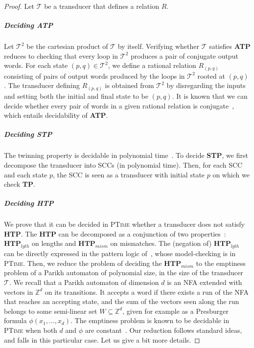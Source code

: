 \documentclass[a4paper,UKenglish,cleveref, autoref, thm-restate,authorcolumns, colorlinks]{lipics-v2021}
\newcommand\calT{\mathcal{T}}
\newcommand{\TP}[0]{\textbf{TP}}
\newcommand{\ATP}[0]{\textbf{ATP}}
\newcommand{\STP}[0]{\textbf{STP}}
\newcommand{\HTP}[0]{\textbf{HTP}}
\begin{document}
\begin{proof}
    Let $\calT$ be a transducer that defines a relation $R$.
    
    \subparagraph*{Deciding \ATP{}} Let $\calT^2$ be the cartesian product of $\calT$ by itself.
    Verifying whether $\calT$ satisfies \ATP{} reduces to checking
    that every loop in $\calT^2$ produces a pair of conjugate output words.
    For each state $(p,q) \in \calT^2$,
    we define a rational relation $R_{(p,q)}$
    consisting of pairs of output words produced by the loops in $\calT^2$ rooted at $(p,q)$.
    The transducer defining $R_{(p,q)}$ is obtained from $\calT^2$
    by disregarding the inputs and setting both the initial and final state to be $(p,q)$.
    It is known that we can decide whether every pair of words in a given rational relation is conjugate~\cite{decidingconjugacy}, which entails decidability of 
   \ATP.
   
    \subparagraph*{Deciding \STP{}} The twinning property is decidable in polynomial time~\cite{twinningproperty}. To decide \STP{}, we first decompose the transducer
    into SCCs (in polynomial time). Then, for each SCC and each state $p$,
    the SCC is seen as a transducer with initial state $p$ on which we check \TP{}.

    \subparagraph*{Deciding \HTP{}} We prove that it can be decided in \textsc{PTime} whether a transducer
    does not satisfy \HTP.
    The \HTP{} can be decomposed as a conjunction of two properties~:
    $\HTP_{lgth}$ on lengths and $\HTP_{mism}$ on mismatches.
    The (negation of) $\HTP_{lgth}$ can be directly expressed in the pattern logic of~\cite{DBLP:journals/ijfcs/FiliotMR20}, whose model-checking is in \textsc{PTime}. 
     Then, we reduce the problem of deciding the $\HTP_{mism}$ to the emptiness problem of a Parikh automaton of polynomial size, in the size of the transducer $\calT$. We recall that a Parikh automaton of dimension $d$ is an NFA extended with vectors in $\mathbb{Z}^d$ on its transitions. It accepts a word if there exists a run of the NFA that reaches an accepting state, and the sum of the vectors seen along the run belongs to some semi-linear set $W\subseteq \mathbb{Z}^d$, given for example as a Presburger formula $\phi(x_1,\dots,x_d)$. The emptiness problem is known to be decidable in \textsc{PTime} when both $d$ and $\phi$ are constant~\cite{DBLP:conf/lics/FigueiraL15,DBLP:journals/ijfcs/FiliotMR20}. Our reduction follows standard ideas, 
     and falls in this particular case. Let us give a bit more details. 



\end{proof}
\end{document}
